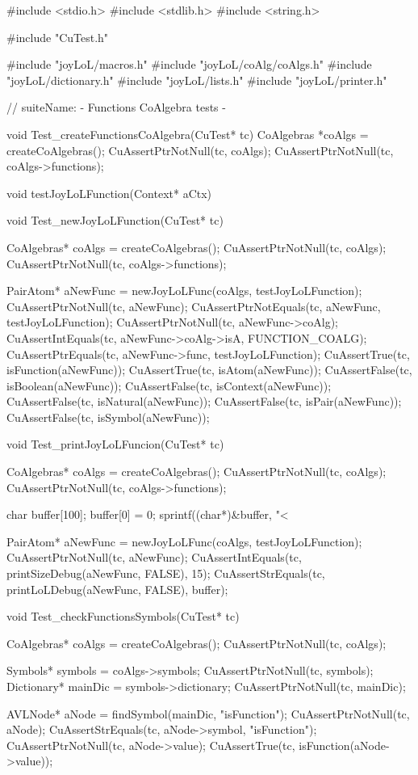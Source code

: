 \starttyping
#include <stdio.h>
#include <stdlib.h>
#include <string.h>

#include "CuTest.h"

#include "joyLoL/macros.h"
#include "joyLoL/coAlg/coAlgs.h"
#include "joyLoL/dictionary.h"
#include "joyLoL/lists.h"
#include "joyLoL/printer.h"

// suiteName: - Functions CoAlgebra tests -

void Test_createFunctionsCoAlgebra(CuTest* tc) {
  CoAlgebras *coAlgs = createCoAlgebras();
  CuAssertPtrNotNull(tc, coAlgs);
  CuAssertPtrNotNull(tc, coAlgs->functions);
}

void testJoyLoLFunction(Context* aCtx) { }


void Test_newJoyLoLFunction(CuTest* tc) {
  CoAlgebras* coAlgs = createCoAlgebras();
  CuAssertPtrNotNull(tc, coAlgs);
  CuAssertPtrNotNull(tc, coAlgs->functions);

  PairAtom* aNewFunc = newJoyLoLFunc(coAlgs, testJoyLoLFunction);
  CuAssertPtrNotNull(tc, aNewFunc);
  CuAssertPtrNotEquals(tc, aNewFunc, testJoyLoLFunction);
  CuAssertPtrNotNull(tc, aNewFunc->coAlg);
  CuAssertIntEquals(tc, aNewFunc->coAlg->isA, FUNCTION_COALG);
  CuAssertPtrEquals(tc, aNewFunc->func, testJoyLoLFunction);
  CuAssertTrue(tc, isFunction(aNewFunc));
  CuAssertTrue(tc, isAtom(aNewFunc));
  CuAssertFalse(tc, isBoolean(aNewFunc));
  CuAssertFalse(tc, isContext(aNewFunc));
  CuAssertFalse(tc, isNatural(aNewFunc));
  CuAssertFalse(tc, isPair(aNewFunc));
  CuAssertFalse(tc, isSymbol(aNewFunc));
}

void Test_printJoyLoLFuncion(CuTest* tc) {
  CoAlgebras* coAlgs = createCoAlgebras();
  CuAssertPtrNotNull(tc, coAlgs);
  CuAssertPtrNotNull(tc, coAlgs->functions);

  char buffer[100];
  buffer[0] = 0;
  sprintf((char*)&buffer, "<%

  PairAtom* aNewFunc = newJoyLoLFunc(coAlgs, testJoyLoLFunction);
  CuAssertPtrNotNull(tc, aNewFunc);
  CuAssertIntEquals(tc, printSizeDebug(aNewFunc, FALSE), 15);
  CuAssertStrEquals(tc, printLoLDebug(aNewFunc, FALSE), buffer);
}

void Test_checkFunctionsSymbols(CuTest* tc) {
  CoAlgebras* coAlgs = createCoAlgebras();
  CuAssertPtrNotNull(tc, coAlgs);

  Symbols* symbols = coAlgs->symbols;
  CuAssertPtrNotNull(tc, symbols);
  Dictionary* mainDic = symbols->dictionary;
  CuAssertPtrNotNull(tc, mainDic);

  AVLNode* aNode = findSymbol(mainDic, "isFunction");
  CuAssertPtrNotNull(tc, aNode);
  CuAssertStrEquals(tc, aNode->symbol, "isFunction");
  CuAssertPtrNotNull(tc, aNode->value);
  CuAssertTrue(tc, isFunction(aNode->value));
}

